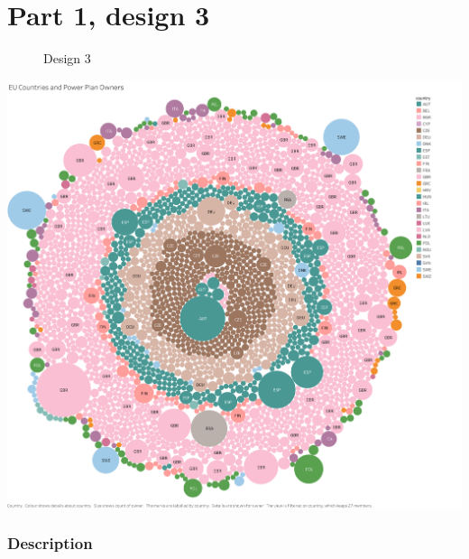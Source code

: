 \hypertarget{part-1-design-3}{%
\section{Part 1, design 3}\label{part-1-design-3}}

\begin{figure}
\centering
\caption{Design 3}
\end{figure}

\centering
\includegraphics[width=15cm]{Viz3.png}

\hypertarget{description}{%
\subsubsection{Description}\label{description}}

